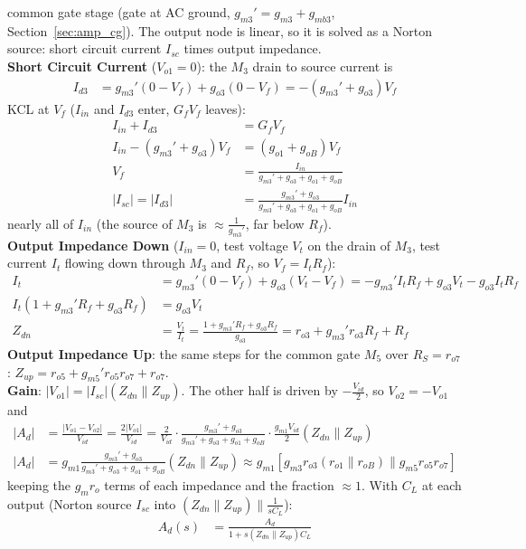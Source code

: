 \begin{enumerate}
    common gate stage (gate at AC ground, \(g_{m3}' = g_{m3} + g_{mb3}\),
    Section~\ref{sec:amp_cg}). The output node is linear, so it is solved as a
    Norton source: short circuit current \(I_{sc}\) times output impedance.\\
    \textbf{Short Circuit Current} (\(V_{o1} = 0\)): the \(M_3\) drain to source current is
    \begin{align*}
      I_{d3} &= g_{m3}'(0 - V_f) + g_{o3}(0 - V_f) = -(g_{m3}' + g_{o3}) V_f
    \end{align*}
    KCL at \(V_f\) (\(I_{in}\) and \(I_{d3}\) enter, \(G_f V_f\) leaves):
    \begin{align*}
      I_{in} + I_{d3} &= G_f V_f \\
      I_{in} - (g_{m3}' + g_{o3}) V_f &= (g_{o1} + g_{oB}) V_f \\
      V_f &= \frac{I_{in}}{g_{m3}' + g_{o3} + g_{o1} + g_{oB}} \\
      |I_{sc}| = |I_{d3}| &= \frac{g_{m3}' + g_{o3}}{g_{m3}' + g_{o3} + g_{o1} + g_{oB}} I_{in}
    \end{align*}
    nearly all of \(I_{in}\) (the source of \(M_3\) is \(\approx \frac{1}{g_{m3}'}\), far below \(R_f\)).\\
    \textbf{Output Impedance Down} (\(I_{in} = 0\), test voltage \(V_t\) on the drain of
    \(M_3\), test current \(I_t\) flowing down through \(M_3\) and \(R_f\), so \(V_f = I_t R_f\)):
    \begin{align*}
      I_t &= g_{m3}'(0 - V_f) + g_{o3}(V_t - V_f) = -g_{m3}' I_t R_f + g_{o3} V_t - g_{o3} I_t R_f \\
      I_t (1 + g_{m3}' R_f + g_{o3} R_f) &= g_{o3} V_t \\
      Z_{dn} &= \frac{V_t}{I_t} = \frac{1 + g_{m3}' R_f + g_{o3} R_f}{g_{o3}} = r_{o3} + g_{m3}' r_{o3} R_f + R_f
    \end{align*}
    \textbf{Output Impedance Up}: the same steps for the common gate \(M_5\) over
    \(R_S = r_{o7}\): \(Z_{up} = r_{o5} + g_{m5}' r_{o5} r_{o7} + r_{o7}\).\\
    \textbf{Gain}: \(|V_{o1}| = |I_{sc}| (Z_{dn} \parallel Z_{up})\). The other half is driven by
    \(-\frac{V_{id}}{2}\), so \(V_{o2} = -V_{o1}\) and
    \begin{align*}
      |A_d| &= \frac{|V_{o1} - V_{o2}|}{V_{id}} = \frac{2|V_{o1}|}{V_{id}}
             = \frac{2}{V_{id}}\cdot\frac{g_{m3}' + g_{o3}}{g_{m3}' + g_{o3} + g_{o1} + g_{oB}}\cdot\frac{g_{m1} V_{id}}{2}(Z_{dn} \parallel Z_{up}) \\
      |A_d| &= g_{m1} \frac{g_{m3}' + g_{o3}}{g_{m3}' + g_{o3} + g_{o1} + g_{oB}} (Z_{dn} \parallel Z_{up})
             \approx g_{m1}\left[g_{m3} r_{o3}(r_{o1} \parallel r_{oB}) \parallel g_{m5} r_{o5} r_{o7}\right]
    \end{align*}
    keeping the \(g_m r_o\) terms of each impedance and the fraction \(\approx 1\). With \(C_L\) at each
    output (Norton source \(I_{sc}\) into \((Z_{dn} \parallel Z_{up}) \parallel \frac{1}{sC_L}\)):
    \begin{align*}
      A_d(s) &= \frac{A_d}{1 + s (Z_{dn} \parallel Z_{up}) C_L} \tag{1}
    \end{align*}
\end{enumerate}

